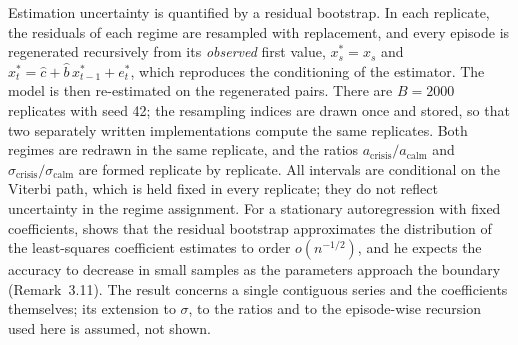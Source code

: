 \documentclass[11pt,a4paper]{article}
\begin{document}
Estimation uncertainty is quantified by a residual bootstrap. In each replicate, the residuals of each regime are resampled with replacement, and every episode is regenerated recursively from its \emph{observed} first value, $x^*_s=x_s$ and $x^*_t=\hat c+\hat b\,x^*_{t-1}+e^*_t$, which reproduces the conditioning of the estimator. The model is then re-estimated on the regenerated pairs. There are $B=2000$ replicates with seed 42; the resampling indices are drawn once and stored, so that two separately written implementations compute the same replicates. Both regimes are redrawn in the same replicate, and the ratios $a_{\mathrm{crisis}}/a_{\mathrm{calm}}$ and $\sigma_{\mathrm{crisis}}/\sigma_{\mathrm{calm}}$ are formed replicate by replicate. All intervals are conditional on the Viterbi path, which is held fixed in every replicate; they do not reflect uncertainty in the regime assignment. For a stationary autoregression with fixed coefficients, \citet[Thm.~3.9]{bose1988} shows that the residual bootstrap approximates the distribution of the least-squares coefficient estimates to order $o(n^{-1/2})$, and he expects the accuracy to decrease in small samples as the parameters approach the boundary (Remark~3.11). The result concerns a single contiguous series and the coefficients themselves; its extension to $\sigma$, to the ratios and to the episode-wise recursion used here is assumed, not shown.
\end{document}
